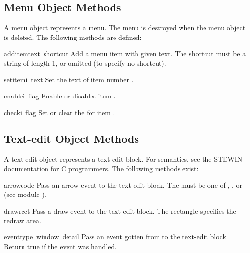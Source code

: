 \subsection{Menu Object Methods}

A menu object represents a menu.
The menu is destroyed when the menu object is deleted.
The following methods are defined:

\renewcommand{\indexsubitem}{(menu method)}
\begin{funcdesc}{additem}{text\, shortcut}
Add a menu item with given text.
The shortcut must be a string of length 1, or omitted (to specify no
shortcut).
\end{funcdesc}

\begin{funcdesc}{setitem}{i\, text}
Set the text of item number
.
\end{funcdesc}

\begin{funcdesc}{enable}{i\, flag}
Enable or disables item
.
\end{funcdesc}

\begin{funcdesc}{check}{i\, flag}
Set or clear the
for item
.
\end{funcdesc}

\subsection{Text-edit Object Methods}

A text-edit object represents a text-edit block.
For semantics, see the STDWIN documentation for C programmers.
The following methods exist:

\renewcommand{\indexsubitem}{(text-edit method)}
\begin{funcdesc}{arrow}{code}
Pass an arrow event to the text-edit block.
The
must be one of
,
,
or
(see module
).
\end{funcdesc}

\begin{funcdesc}{draw}{rect}
Pass a draw event to the text-edit block.
The rectangle specifies the redraw area.
\end{funcdesc}

\begin{funcdesc}{event}{type\, window\, detail}
Pass an event gotten from
to the text-edit block.
Return true if the event was handled.
\end{funcdesc}

